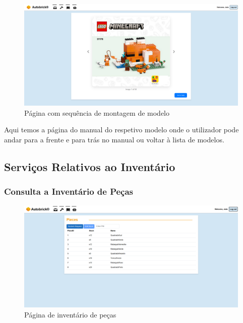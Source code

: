                     \begin{figure}[h!]
                        \centering
                        \includegraphics[width=0.8\linewidth, frame]{images/Site/Manual.pdf}
                        \caption{Página com sequência de montagem de modelo}
                        \label{fig:Página de fila de montagem de encomendas}
                    \end{figure}

                    Aqui temos a página do manual do respetivo modelo onde o utilizador pode andar para a frente e para trás no manual ou voltar à lista de modelos.
                    

            \subsection{Serviços Relativos ao Inventário}
                
                \subsubsection{Consulta a Inventário de Peças} %
                    
                    \begin{figure}[h!]
                        \centering
                        \includegraphics[width=0.8\linewidth, frame]{images/Site/Inventory.pdf}
                        \caption{Página de inventário de peças}
                        \label{fig:Página de inventário}
                    \end{figure}

